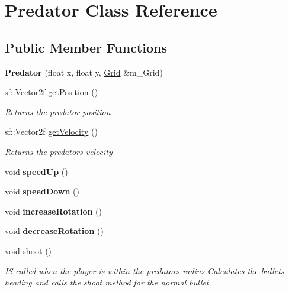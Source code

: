 \hypertarget{class_predator}{}\section{Predator Class Reference}
\label{class_predator}
\subsection*{Public Member Functions}
\begin{DoxyCompactItemize}
\item 
\mbox{\label{class_predator_ae03e3ab3b6041c390e15e816d89e9044}} 
{\bfseries Predator} (float x, float y, \mbox{\hyperlink{class_grid}{Grid}} \&m\+\_\+\+Grid)
\item 
sf\+::\+Vector2f \mbox{\hyperlink{class_predator_aedebee8eb0a1f05ae209a44a014b3e97}{get\+Position}} ()
\begin{DoxyCompactList}\small\item\em Returns the predator position \end{DoxyCompactList}\item 
sf\+::\+Vector2f \mbox{\hyperlink{class_predator_a64ef7e1c8e4f9060200d539ab8aeef9a}{get\+Velocity}} ()
\begin{DoxyCompactList}\small\item\em Returns the predators velocity \end{DoxyCompactList}\item 
\mbox{\label{class_predator_aeea21bd462a09914350ebb34ef3a8f12}} 
void {\bfseries speed\+Up} ()
\item 
\mbox{\label{class_predator_a64137f8aca447a8172e151c0e419e8b3}} 
void {\bfseries speed\+Down} ()
\item 
\mbox{\label{class_predator_a916e1cdedef158acc62474d64e767266}} 
void {\bfseries increase\+Rotation} ()
\item 
\mbox{\label{class_predator_a58d84a6839f77f2ebdfb0f25838edaf5}} 
void {\bfseries decrease\+Rotation} ()
\item 
void \mbox{\hyperlink{class_predator_ac078fe0abadc023f09ee100b7623be49}{shoot}} ()
\begin{DoxyCompactList}\small\item\em IS called when the player is within the predators radius Calculates the bullets heading and calls the shoot method for the normal bullet \end{DoxyCompactList}\item 

\end{DoxyCompactItemize}
